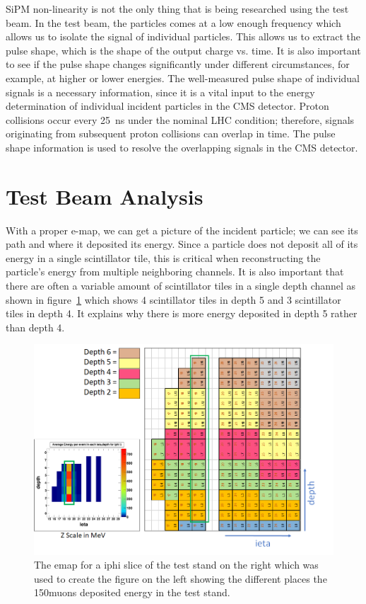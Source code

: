 SiPM non-linearity is not the only thing that is being researched using the test beam. In the test beam, the particles comes at a low enough frequency which allows us to isolate the signal of individual particles. This allows us to extract the pulse shape, which is the shape of the output charge vs. time. It is also important to see if the pulse shape changes significantly under different circumstances, for example, at higher or lower energies. The well-measured pulse shape of individual signals is a necessary information, since it is a vital input to the energy determination of individual incident particles in the CMS detector. Proton collisions occur every 25~ns under the nominal LHC condition; therefore, signals originating from subsequent proton collisions can overlap in time. The pulse shape information is used to resolve the overlapping signals in the CMS detector.

\section{Test Beam Analysis}

With a proper e-map, we can get a picture of the incident particle; we can see its path and where it deposited its energy. Since a particle does not deposit all of its energy in a single scintillator tile, this is critical when reconstructing the particle's energy from multiple neighboring channels. It is also important that there are often a variable amount of scintillator tiles in a single depth channel as shown in figure~\ref{fig:emap} which shows 4 scintillator tiles in depth 5 and 3 scintillator tiles in depth 4. It explains why there is more energy deposited in depth 5 rather than depth 4. 

\begin{figure}
\centering
\includegraphics[width=\linewidth]{Figures/eplot.png}
\caption{The emap for a iphi slice of the test stand on the right which was used to create the figure on the left showing the different places the 150\GeV\space muons deposited energy in the test stand.}
\label{fig:emap}
\end{figure}


